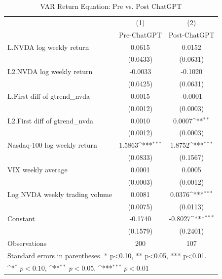 \begin{table}[htbp]\centering
\def\sym#1{\ifmmode^{#1}\else\(^{#1}\)\fi}
\caption{VAR Return Equation: Pre vs. Post ChatGPT}
\begin{tabular}{l*{2}{c}}
\toprule
                    &\multicolumn{1}{c}{(1)}&\multicolumn{1}{c}{(2)}\\
                    &\multicolumn{1}{c}{Pre-ChatGPT}&\multicolumn{1}{c}{Post-ChatGPT}\\
\midrule
L.NVDA log weekly return&      0.0615         &      0.0152         \\
                    &    (0.0433)         &    (0.0631)         \\
\addlinespace
L2.NVDA log weekly return&     -0.0033         &     -0.1020         \\
                    &    (0.0425)         &    (0.0631)         \\
\addlinespace
L.First diff of gtrend\_nvda&      0.0015         &     -0.0001         \\
                    &    (0.0012)         &    (0.0003)         \\
\addlinespace
L2.First diff of gtrend\_nvda&      0.0010         &      0.0007\sym{**} \\
                    &    (0.0012)         &    (0.0003)         \\
\addlinespace
Nasdaq-100 log weekly return&      1.5863\sym{***}&      1.8752\sym{***}\\
                    &    (0.0833)         &    (0.1567)         \\
\addlinespace
VIX weekly average  &      0.0001         &      0.0005         \\
                    &    (0.0003)         &    (0.0012)         \\
\addlinespace
Log NVDA weekly trading volume&      0.0081         &      0.0376\sym{***}\\
                    &    (0.0075)         &    (0.0113)         \\
\addlinespace
Constant            &     -0.1740         &     -0.8027\sym{***}\\
                    &    (0.1579)         &    (0.2401)         \\
\midrule
Observations        &         200         &         107         \\
\bottomrule
\multicolumn{3}{l}{\footnotesize Standard errors in parentheses. * p<0.10, ** p<0.05, *** p<0.01.}\\
\multicolumn{3}{l}{\footnotesize \sym{*} \(p<0.10\), \sym{**} \(p<0.05\), \sym{***} \(p<0.01\)}\\
\end{tabular}
\end{table}
